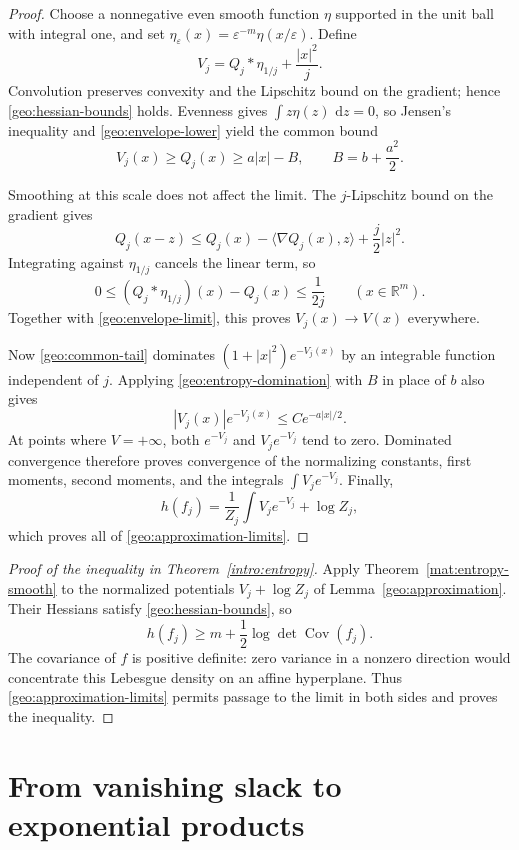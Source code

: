 \documentclass[11pt]{article}
\newcommand{\R}{\mathbb R}
\DeclareMathOperator{\Cov}{Cov}
\newcommand{\dd}{\,\mathrm d}
\theoremstyle{definition}
\theoremstyle{remark}
\numberwithin{equation}{section}
\begin{document}
\begin{proof}
Choose a nonnegative even smooth function $\eta$ supported in the unit ball
with integral one, and set $\eta_\varepsilon(x)=\varepsilon^{-m}
\eta(x/\varepsilon)$.  Define
\begin{equation}\label{geo:smooth-potentials}
  V_j=Q_j*\eta_{1/j}+\frac{|x|^2}j.
\end{equation}
Convolution preserves convexity and the Lipschitz bound on the gradient;
hence \eqref{geo:hessian-bounds} holds.  Evenness gives
$\int z\eta(z)\,\dd z=0$, so Jensen's inequality and
\eqref{geo:envelope-lower} yield the common bound
\begin{equation}\label{geo:common-tail}
  V_j(x)\geq Q_j(x)\geq a|x|-B,
  \qquad B=b+\frac{a^2}2.
\end{equation}

Smoothing at this scale does not affect the limit.  The $j$-Lipschitz
bound on the gradient gives
\[
  Q_j(x-z)\leq Q_j(x)-\langle\nabla Q_j(x),z\rangle+\frac j2|z|^2.
\]
Integrating against $\eta_{1/j}$ cancels the linear term, so
\[
  0\leq (Q_j*\eta_{1/j})(x)-Q_j(x)\leq\frac1{2j}
  \qquad(x\in\R^m).
\]
Together with \eqref{geo:envelope-limit}, this proves
$V_j(x)\to V(x)$ everywhere.

Now \eqref{geo:common-tail} dominates $(1+|x|^2)e^{-V_j(x)}$ by an
integrable function independent of $j$.  Applying
\eqref{geo:entropy-domination} with $B$ in place of $b$ also gives
\[
  |V_j(x)|e^{-V_j(x)}\leq C e^{-a|x|/2}.
\]
At points where $V=+\infty$, both $e^{-V_j}$ and $V_je^{-V_j}$ tend to
zero.  Dominated convergence therefore proves convergence of the
normalizing constants, first moments, second moments, and the integrals
$\int V_je^{-V_j}$.  Finally,
\[
  h(f_j)=\frac1{Z_j}\int V_je^{-V_j}+\log Z_j,
\]
which proves all of \eqref{geo:approximation-limits}.
\end{proof}

\begin{proof}[Proof of the inequality in Theorem~\ref{intro:entropy}]
Apply Theorem~\ref{mat:entropy-smooth} to the normalized potentials
$V_j+\log Z_j$ of Lemma~\ref{geo:approximation}.  Their Hessians satisfy
\eqref{geo:hessian-bounds}, so
\[
  h(f_j)\geq m+\frac12\log\det\Cov(f_j).
\]
The covariance of $f$ is positive definite: zero variance in a nonzero
direction would concentrate this Lebesgue density on an affine hyperplane.
Thus \eqref{geo:approximation-limits} permits passage to the limit in both
sides and proves the inequality.
\end{proof}


\section{From vanishing slack to exponential products}\label{sec:rigidity}
\end{document}
